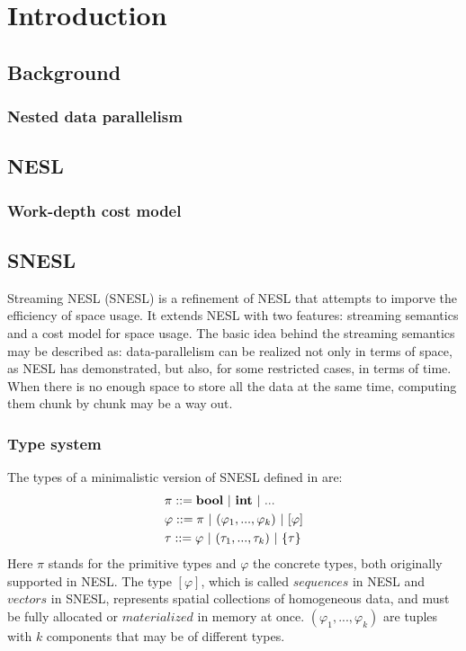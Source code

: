 \chapter{Introduction}

\section{Background}
\subsection{Nested data parallelism}

\section{NESL}

\subsection{Work-depth cost model}


\section{SNESL}
Streaming NESL (SNESL) \cite{Fphd} is a refinement of NESL
that attempts to imporve the efficiency of space usage. 
It extends NESL with two features: streaming semantics and a cost model for space usage. 
The basic idea behind the streaming semantics may be described as:
data-parallelism can be realized not only in terms of space, as NESL has demonstrated, but also, for some restricted cases, in terms of time. 
When there is no enough space to store all the data at the same time, computing them chunk by chunk may be a way out.

\subsection{Type system}

The types of a minimalistic version of SNESL defined in \cite{Fphd} are:
\begin{align*} 
& \pi ::= \bool \ | \ \int \ | \ ...  \\
& \varphi ::= \pi \ | \ (\varphi_1,...,\varphi_k) \ | \ [\varphi]  \\
& \tau ::= \varphi \ | \ (\tau_1,...,\tau_k) \ | \ \tseq{\tau}  
\end{align*}
Here $\pi$ stands for the primitive types and $\varphi$ the concrete types, both originally supported in NESL.
The type $[\varphi]$, which is called $sequences$ in NESL and $vectors$ in SNESL, represents spatial collections of homogeneous data, and must be
fully allocated or $materialized$ in memory at once.  $(\varphi_1,...,\varphi_k)$ are tuples with $k$ components that may be of different types.

